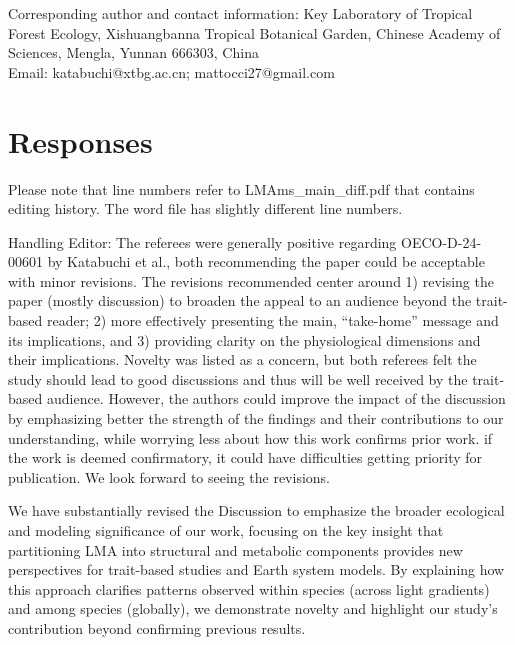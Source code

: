 \documentclass[
  12pt,
  letterpaper,
  DIV=11,
  numbers=noendperiod]{scrartcl}
\renewenvironment{quote}
  {\begin{customblockquote}\color{blockquote-text}\ignorespaces}
  {\end{customblockquote}}
\begin{document}
Corresponding author and contact information: Key Laboratory of Tropical
Forest Ecology, Xishuangbanna Tropical Botanical Garden, Chinese Academy
of Sciences, Mengla, Yunnan 666303, China\\
Email: katabuchi@xtbg.ac.cn; mattocci27@gmail.com

\newpage

\section{Responses}\label{responses}

Please note that line numbers refer to LMAms\_main\_diff.pdf that
contains editing history. The word file has slightly different line
numbers.

\begin{quote}
Handling Editor: The referees were generally positive regarding
OECO-D-24-00601 by Katabuchi et al., both recommending the paper could
be acceptable with minor revisions. The revisions recommended center
around 1) revising the paper (mostly discussion) to broaden the appeal
to an audience beyond the trait-based reader; 2) more effectively
presenting the main, ``take-home'' message and its implications, and 3)
providing clarity on the physiological dimensions and their
implications. Novelty was listed as a concern, but both referees felt
the study should lead to good discussions and thus will be well received
by the trait-based audience. However, the authors could improve the
impact of the discussion by emphasizing better the strength of the
findings and their contributions to our understanding, while worrying
less about how this work confirms prior work. if the work is deemed
confirmatory, it could have difficulties getting priority for
publication. We look forward to seeing the revisions.
\end{quote}

We have substantially revised the Discussion to emphasize the broader
ecological and modeling significance of our work, focusing on the key
insight that partitioning LMA into structural and metabolic components
provides new perspectives for trait-based studies and Earth system
models. By explaining how this approach clarifies patterns observed
within species (across light gradients) and among species (globally), we
demonstrate novelty and highlight our study's contribution beyond
confirming previous results.
\end{document}
